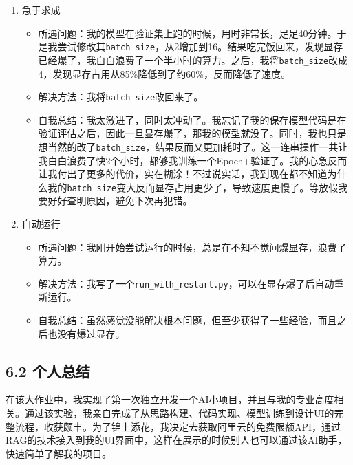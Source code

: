 \documentclass[a4paper,12pt]{article}
\begin{document}
\begin{enumerate}
\begin{itemize}
        \item 自我总结：虽然为了调这几个颜色花费了很多时间，甚至背景图最终还是没有整出来，但我在这其中学到的不仅是如何更换主题颜色，还学到了如何上网搜索教程以满足自己的美观需求。
    \end{itemize}
    \item 急于求成
    \begin{itemize}
        \item 所遇问题：我的模型在验证集上跑的时候，用时非常长，足足40分钟。于是我尝试修改其\texttt{batch\_size}，从2增加到16。结果吃完饭回来，发现显存已经爆了，我白白浪费了一个半小时的算力。之后，我将\texttt{batch\_size}改成4，发现显存占用从85\%降低到了约60\%，反而降低了速度。
        \item 解决方法：我将\texttt{batch\_size}改回来了。
        \item 自我总结：我太激进了，同时太冲动了。我忘记了我的保存模型代码是在验证评估之后，因此一旦显存爆了，那我的模型就没了。同时，我也只是想当然的改了\texttt{batch\_size}，结果反而又更加耗时了。这一连串操作一共让我白白浪费了快2个小时，都够我训练一个Epoch+验证了。我的心急反而让我付出了更多的代价，实在糊涂！不过说实话，我到现在都不知道为什么我的\texttt{batch\_size}变大反而显存占用更少了，导致速度更慢了。等放假我要好好查明原因，避免下次再犯错。
    \end{itemize}
    \item 自动运行
    \begin{itemize}
        \item 所遇问题：我刚开始尝试运行的时候，总是在不知不觉间爆显存，浪费了算力。
        \item 解决方法：我写了一个\texttt{run\_with\_restart.py}，可以在显存爆了后自动重新运行。
        \item 自我总结：虽然感觉没能解决根本问题，但至少获得了一些经验，而且之后也没有爆过显存。
    \end{itemize}
\end{enumerate}

\subsection*{6.2 个人总结}

\hspace{2em}在该大作业中，我实现了第一次独立开发一个AI小项目，并且与我的专业高度相关。通过该实验，我亲自完成了从思路构建、代码实现、模型训练到设计UI的完整流程，收获颇丰。为了锦上添花，我决定去获取阿里云的免费限额API，通过RAG的技术接入到我的UI界面中，这样在展示的时候别人也可以通过该AI助手，快速简单了解我的项目。
\end{document}
